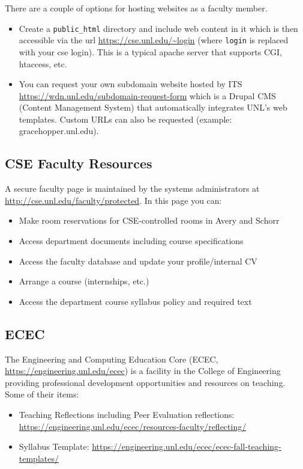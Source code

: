 \documentclass[12pt]{scrartcl}
\begin{document}
There are a couple of options for hosting websites as a 
faculty member.

\begin{itemize}
  \item Create a \texttt{public_html} directory
  and include web content in it which is then accessible via the
  url \url{https://cse.unl.edu/~login} (where \texttt{login}
  is replaced with your cse login).  This is a typical apache server
  that supports CGI, htaccess, etc.
  \item You can request your own subdomain website hosted by ITS
  \url{https://wdn.unl.edu/subdomain-request-form} which is a Drupal
  CMS (Content Management System) that automatically 
  integrates UNL's web templates.  Custom URLs can also
  be requested (example: gracehopper.unl.edu).
\end{itemize}

\subsection{CSE Faculty Resources}

A secure faculty page is maintained by the systems administrators
at \url{http://cse.unl.edu/faculty/protected}.  In this page you can:
\begin{itemize}
  \item Make room reservations for CSE-controlled rooms in Avery and Schorr
  \item Access department documents including course specifications
  \item Access the faculty database and update your profile/internal CV
  \item Arrange a course (internships, etc.)
  \item Access the department course syllabus policy and required text
\end{itemize}

\subsection{ECEC}

The Engineering and Computing Education Core (ECEC, \url{https://engineering.unl.edu/ecec})
is a facility in the College of Engineering providing professional development
opportunities and resources on teaching.  Some of their items:
\begin{itemize}
  \item Teaching Reflections including Peer Evaluation reflections: \url{https://engineering.unl.edu/ecec/resources-faculty/reflecting/}
  \item Syllabus Template: \url{https://engineering.unl.edu/ecec/ecec-fall-teaching-templates/}
\end{itemize}
\end{document}
